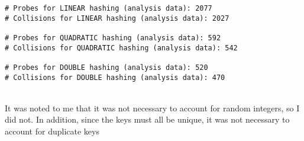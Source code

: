 \documentclass[20pt]{article} %
\begin{document}
\begin{verbatim}
# Probes for LINEAR hashing (analysis data): 2077
# Collisions for LINEAR hashing (analysis data): 2027

# Probes for QUADRATIC hashing (analysis data): 592
# Collisions for QUADRATIC hashing (analysis data): 542

# Probes for DOUBLE hashing (analysis data): 520
# Collisions for DOUBLE hashing (analysis data): 470
\end{verbatim}

\\

It was noted to me that it was not necessary to account for random integers, so I did not.  In addition, since the keys must all be unique, it was not necessary to account for duplicate keys
\end{document}
